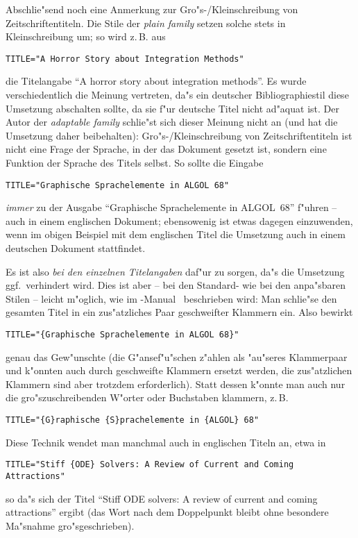 Abschlie"send noch eine Anmerkung zur Gro"s-/Kleinschreibung von
Zeitschriftentiteln. Die Stile der {\em plain family\/} setzen solche stets
in Kleinschreibung um; so wird z.\,B. aus
\begin{verbatim}
TITLE="A Horror Story about Integration Methods"
\end{verbatim}
die Titelangabe "`A horror story about integration methods"'. Es wurde
verschiedentlich die Meinung vertreten, da"s ein deutscher Bibliographiestil
diese Umsetzung abschalten sollte, da sie f"ur deutsche Titel nicht ad"aquat
ist. Der Autor der {\em adaptable family\/} schlie"st sich dieser Meinung
nicht an (und hat die Umsetzung daher beibehalten): Gro"s-/Kleinschreibung
von Zeitschriftentiteln ist nicht eine Frage der Sprache, in der das
Dokument gesetzt ist, sondern eine Funktion der Sprache des Titels selbst.
So sollte die Eingabe
\begin{verbatim}
TITLE="Graphische Sprachelemente in ALGOL 68"
\end{verbatim}
{\em immer\/} zu der Ausgabe "`Graphische Sprachelemente in ALGOL~68"'
f"uhren -- auch in einem englischen Dokument; ebensowenig ist etwas dagegen
einzuwenden, wenn im obigen Beispiel mit dem englischen Titel die Umsetzung
auch in einem deutschen Dokument stattfindet.

Es ist also {\em bei den einzelnen Titelangaben\/} daf"ur zu sorgen, da"s die
Umsetzung ggf.~verhindert wird. Dies ist aber -- bei den Standard- wie bei
den anpa"sbaren Stilen -- leicht m"oglich, wie im
\BibTeX-Manual~\cite{bibtex-doc} beschrieben wird: Man schlie"se den
gesamten Titel in ein zus"atzliches Paar geschweifter Klammern ein. Also
bewirkt
\begin{verbatim}
TITLE="{Graphische Sprachelemente in ALGOL 68}"
\end{verbatim}
genau das Gew"unschte (die G"ansef"u"schen z"ahlen als "au"seres Klammerpaar
und k"onnten auch durch geschweifte Klammern ersetzt werden, die
zus"atzlichen Klammern sind aber trotzdem erforderlich). Statt dessen
k"onnte man auch nur die gro"szuschreibenden W"orter oder Buchstaben
klammern, z.\,B.
\begin{verbatim}
TITLE="{G}raphische {S}prachelemente in {ALGOL} 68"
\end{verbatim}
Diese Technik wendet man manchmal auch in englischen Titeln an, etwa in
\begin{verbatim}
TITLE="Stiff {ODE} Solvers: A Review of Current and Coming Attractions"
\end{verbatim}
so da"s sich der Titel "`Stiff ODE solvers: A review of current and coming
attractions"' ergibt (das Wort nach dem Doppelpunkt bleibt ohne besondere
Ma"snahme gro"sgeschrieben).


\footnotesize


